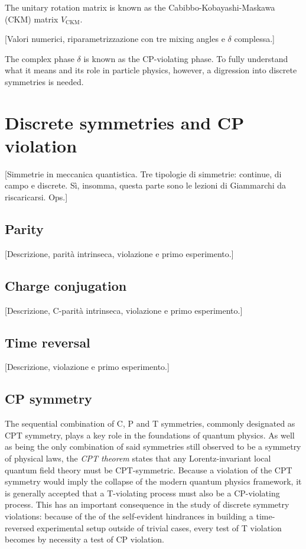 The unitary rotation matrix is known as the Cabibbo-Kobayashi-Maskawa (CKM) matrix $V_\text{CKM}$.

[Valori numerici, riparametrizzazione con tre mixing angles e $\delta$ complessa.]

The complex phase $\delta$ is known as the CP-violating phase. To fully understand what it means and its role in particle physics, however, a digression into discrete symmetries is needed.

\section{Discrete symmetries and CP violation}
\label{sec:discrete}
[Simmetrie in meccanica quantistica. Tre tipologie di simmetrie: continue, di campo e discrete. Sì, insomma, questa parte sono le lezioni di Giammarchi da riscaricarsi. Ops.]

\subsection{Parity}
[Descrizione, parità intrinseca, violazione e primo esperimento.]

\subsection{Charge conjugation}
\label{sec:C-symmetry}
[Descrizione, C-parità intrinseca, violazione e primo esperimento.]

\subsection{Time reversal}
[Descrizione, violazione e primo esperimento.]

\subsection{CP symmetry}
The sequential combination of C, P and T symmetries, commonly designated as CPT symmetry, plays a key role in the foundations of quantum physics.
As well as being the only combination of said symmetries still observed to be a symmetry of physical laws, the \textit{CPT theorem} states that any Lorentz-invariant local quantum field theory must be CPT-symmetric.
Because a violation of the CPT symmetry would imply the collapse of the modern quantum physics framework, it is generally accepted that a T-violating process must also be a CP-violating process.
This has an important consequence in the study of discrete symmetry violations: because of the of the self-evident hindrances in building a time-reversed experimental setup outside of trivial cases, every test of T violation becomes by necessity a test of CP violation.

